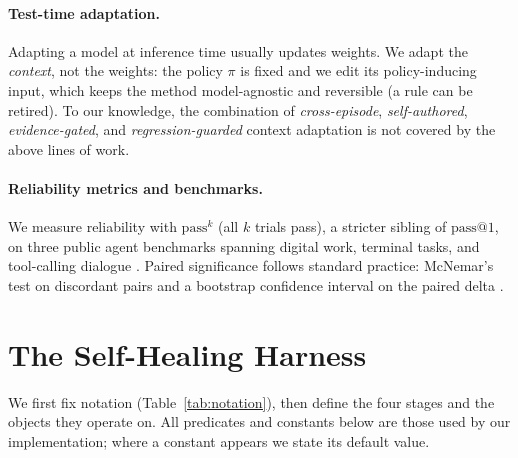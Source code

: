 \documentclass[letterpaper]{article} %
\makeatletter
\newcommand{\passk}{\mathrm{pass}^{k}}
\newcommand{\passone}{\mathrm{pass@}1}
\makeatother
\begin{document}
\paragraph{Test-time adaptation.} Adapting a model at inference time \citep{placeholder-tta}
usually updates weights. We adapt the \emph{context}, not the weights: the policy $\pi$ is
fixed and we edit its policy-inducing input, which keeps the method model-agnostic and
reversible (a rule can be retired). To our knowledge, the combination of \emph{cross-episode},
\emph{self-authored}, \emph{evidence-gated}, and \emph{regression-guarded} context adaptation
is not covered by the above lines of work.

\paragraph{Reliability metrics and benchmarks.} We measure reliability with $\passk$ (all $k$
trials pass), a stricter sibling of $\passone$, on three public agent benchmarks spanning
digital work, terminal tasks, and tool-calling dialogue
\citep{trivedi2024appworld,merrill2026terminal,barres2025tau}. Paired significance
follows standard practice: McNemar's test on discordant pairs \citep{placeholder-mcnemar} and a
bootstrap confidence interval on the paired delta \citep{placeholder-bootstrap}.

\section{The Self-Healing Harness}
\label{sec:harness}

We first fix notation (Table~\ref{tab:notation}), then define the four stages and the objects
they operate on. All predicates and constants below are those used by our implementation; where
a constant appears we state its default value.
\end{document}
